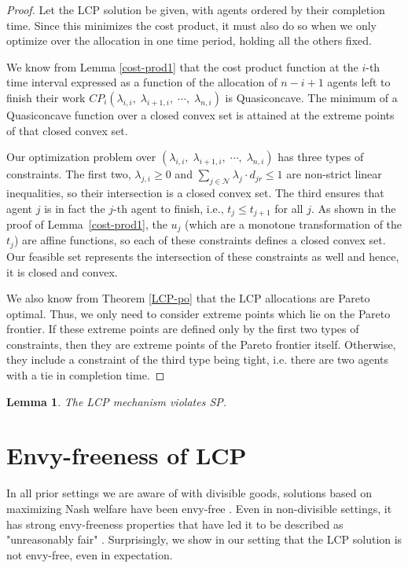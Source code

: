 \documentclass[letterpaper]{article} %
\newtheorem{lemma}{Lemma}
\theoremstyle{definition}
\begin{document}
\begin{proof}
Let the LCP solution be given, with agents ordered by their completion time.  Since this minimizes the cost product, it must also do so when we only optimize over the allocation in one time period, holding all the others fixed.

We know from Lemma \ref{cost-prod1} that the cost product function at the $i$-th time interval expressed as a function of the allocation of $n - i + 1$ agents left to finish their work $CP_i(\lambda_{i,i}, \; \lambda_{i+1,i}, \; \cdots ,\; \lambda_{n,i})$ is Quasiconcave. The minimum of a Quasiconcave function over a closed convex set is attained at the extreme points of that closed convex set.

Our optimization problem over $(\lambda_{i,i}, \; \lambda_{i+1,i}, \; \cdots ,\; \lambda_{n,i})$ has three types of constraints.  The first two, $\lambda_{j,i} \geq 0$ and $\sum_{j \in \mathcal{N}} \lambda_{j} \cdot d_{jr} \leq 1$ are non-strict linear inequalities, so their intersection is a closed convex set.  The third ensures that agent $j$ is in fact the $j$-th agent to finish, i.e., $t_j \leq t_{j+1}$ for all $j$.  As shown in the proof of Lemma~\ref{cost-prod1}, the $u_j$ (which are a monotone transformation of the $t_j$) are affine functions, so each of these constraints defines a closed convex set.  Our feasible set represents the intersection of these constraints as well and hence, it is closed and convex.

We also know from Theorem \ref{LCP-po} that the LCP allocations are Pareto optimal. Thus, we only need to consider extreme points which lie on the Pareto frontier.  If these extreme points are defined only by the first two types of constraints, then they are extreme points of the Pareto frontier itself.  Otherwise, they include a constraint of the third type being tight, i.e. there are two agents with a tie in completion time.
\end{proof}


\begin{lemma} \label{lcp-sp}
The LCP mechanism violates SP.
\end{lemma}


\section{Envy-freeness of LCP}

In all prior settings we are aware of with divisible goods, solutions based on maximizing Nash welfare have been envy-free \cite{VARIAN197463, moulin2004fair, bogomolnaia2017competitive,bogomolnaia2019dividing,goel2019markets}. Even in non-divisible settings, it has strong envy-freeness properties that have led it to be described as "unreasonably fair" \cite{Caragiannis2016MaxNashWelfare}.  Surprisingly, we show in our setting that the LCP solution is not envy-free, even in expectation.
\end{document}
